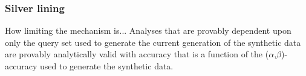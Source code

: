 \begin{frame}
	\frametitle{Silver lining}
	\begin{block}{How limiting the mechanism is...}
		Analyses that are provably dependent upon only the query set used to generate the current generation of
		the synthetic data are provably analytically valid with accuracy that is a function of the ($\alpha$,$\beta$)-accuracy used
		to generate the synthetic data.
	\end{block}
\end{frame}

